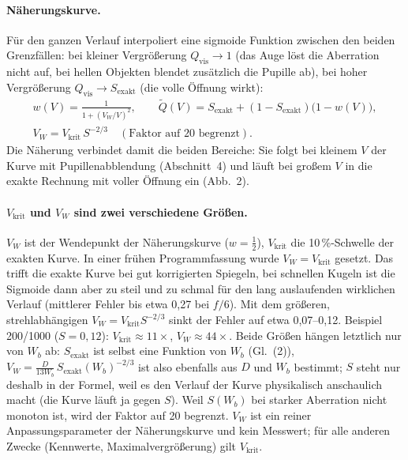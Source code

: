 \documentclass[11pt,a4paper]{article}
\newcommand{\Qvis}{Q_{\mathrm{vis}}}
\newcommand{\Vkrit}{V_{\mathrm{krit}}}
\begin{document}
\paragraph{Näherungskurve.} Für den ganzen Verlauf interpoliert eine sigmoide Funktion zwischen den beiden Grenzfällen: bei kleiner Vergrößerung $\Qvis\to1$ (das Auge löst die Aberration nicht auf, bei hellen Objekten blendet zusätzlich die Pupille ab), bei hoher Vergrößerung $\Qvis\to S_{\mathrm{exakt}}$ (die volle Öffnung wirkt):
\begin{gather}
w(V)=\frac{1}{1+(V_W/V)^2},\qquad \tilde Q(V)=S_{\mathrm{exakt}}+(1-S_{\mathrm{exakt}})\big(1-w(V)\big),\\
V_W=\Vkrit\,S^{-2/3}\quad(\text{Faktor auf }20\text{ begrenzt}).
\end{gather}
Die Näherung verbindet damit die beiden Bereiche: Sie folgt bei kleinem $V$ der Kurve mit Pupillenabblendung (Abschnitt~4) und läuft bei großem $V$ in die exakte Rechnung mit voller Öffnung ein (Abb.~2).

\paragraph{$\Vkrit$ und $V_W$ sind zwei verschiedene Größen.} $V_W$ ist der Wendepunkt der Näherungskurve ($w=\tfrac12$), $\Vkrit$ die 10\,\%-Schwelle der exakten Kurve. In einer frühen Programmfassung wurde $V_W=\Vkrit$ gesetzt. Das trifft die exakte Kurve bei gut korrigierten Spiegeln, bei schnellen Kugeln ist die Sigmoide dann aber zu steil und zu schmal für den lang auslaufenden wirklichen Verlauf (mittlerer Fehler bis etwa 0,27 bei $f/6$). Mit dem größeren, strehlabhängigen $V_W=\Vkrit S^{-2/3}$ sinkt der Fehler auf etwa 0,07--0,12. Beispiel 200/1000 ($S=0{,}12$): $\Vkrit\approx11\times$, $V_W\approx44\times$. Beide Größen hängen letztlich nur von $W_b$ ab: $S_{\mathrm{exakt}}$ ist selbst eine Funktion von $W_b$ (Gl.~(2)), $V_W=\frac{D}{13W_b}\,S_{\mathrm{exakt}}(W_b)^{-2/3}$ ist also ebenfalls aus $D$ und $W_b$ bestimmt; $S$ steht nur deshalb in der Formel, weil es den Verlauf der Kurve physikalisch anschaulich macht (die Kurve läuft ja gegen $S$). Weil $S(W_b)$ bei starker Aberration nicht monoton ist, wird der Faktor auf 20 begrenzt. $V_W$ ist ein reiner Anpassungsparameter der Näherungskurve und kein Messwert; für alle anderen Zwecke (Kennwerte, Maximalvergrößerung) gilt $\Vkrit$.
\end{document}

